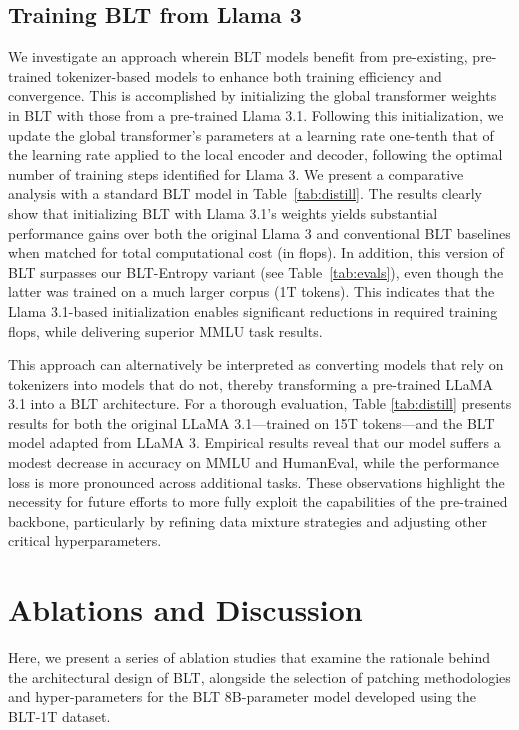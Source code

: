 \subsection{Training {\textsc BLT} from Llama 3}
\label{sec:distillation}
We investigate an approach wherein {\textsc BLT} models benefit from pre-existing, pre-trained tokenizer-based models to enhance both training efficiency and convergence. This is accomplished by initializing the global transformer weights in {\textsc BLT} with those from a pre-trained Llama 3.1. Following this initialization, we update the global transformer’s parameters at a learning rate one-tenth that of the learning rate applied to the local encoder and decoder, following the optimal number of training steps identified for Llama 3. We present a comparative analysis with a standard {\textsc BLT} model in Table~\ref{tab:distill}. The results clearly show that initializing {\textsc BLT} with Llama 3.1’s weights yields substantial performance gains over both the original Llama 3 and conventional {\textsc BLT} baselines when matched for total computational cost (in flops). In addition, this version of {\textsc BLT} surpasses our {\textsc BLT}-Entropy variant (see Table~\ref{tab:evals}), even though the latter was trained on a much larger corpus (1T tokens). This indicates that the Llama 3.1-based initialization enables significant reductions in required training flops, while delivering superior MMLU task results.

This approach can alternatively be interpreted as converting models that rely on tokenizers into models that do not, thereby transforming a pre-trained LLaMA 3.1 into a {\textsc BLT} architecture. For a thorough evaluation, Table \ref{tab:distill} presents results for both the original LLaMA 3.1—trained on 15T tokens—and the {\textsc BLT} model adapted from LLaMA 3. Empirical results reveal that our model suffers a modest decrease in accuracy on MMLU and HumanEval, while the performance loss is more pronounced across additional tasks. These observations highlight the necessity for future efforts to more fully exploit the capabilities of the pre-trained backbone, particularly by refining data mixture strategies and adjusting other critical hyperparameters.

\section{Ablations and Discussion}
\label{section:ablations}
Here, we present a series of ablation studies that examine the rationale behind the architectural design of {\textsc BLT}, alongside the selection of patching methodologies and hyper-parameters for the {\textsc BLT} 8B-parameter model developed using the {\textsc BLT}-1T dataset.

